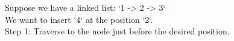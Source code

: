 \documentclass[preview]{standalone}
\begin{document}
Suppose we have a linked list: `1 -> 2 -> 3`\\We want to insert `4` at the position `2`.\\Step 1: Traverse to the node just before the desired position.\\
\end{document}
